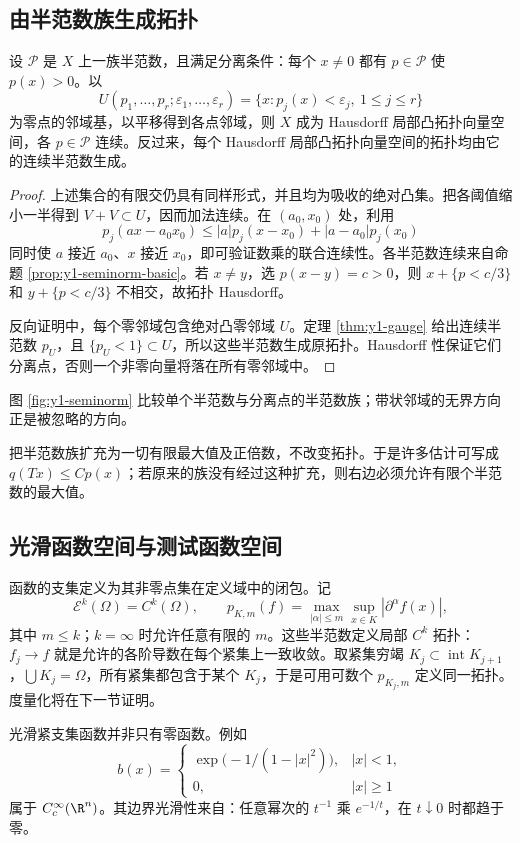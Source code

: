 \subsection{由半范数族生成拓扑}
\begin{theorem}[局部凸空间的半范数刻画]\label{thm:y1-lc}
设 $\mathcal P$ 是 $X$ 上一族半范数，且满足分离条件：每个 $x\ne0$ 都有 $p\in\mathcal P$ 使 $p(x)>0$。以
\[
 U(p_1,\ldots,p_r;\varepsilon_1,\ldots,\varepsilon_r)
 =\{x:p_j(x)<\varepsilon_j,\ 1\le j\le r\}
\]
为零点的邻域基，以平移得到各点邻域，则 $X$ 成为 Hausdorff 局部凸拓扑向量空间，各 $p\in\mathcal P$ 连续。反过来，每个 Hausdorff 局部凸拓扑向量空间的拓扑均由它的连续半范数生成。
\end{theorem}
\begin{proof}
上述集合的有限交仍具有同样形式，并且均为吸收的绝对凸集。把各阈值缩小一半得到 $V+V\subset U$，因而加法连续。在 $(a_0,x_0)$ 处，利用
\[
 p_j(ax-a_0x_0)\le |a|p_j(x-x_0)+|a-a_0|p_j(x_0)
\]
同时使 $a$ 接近 $a_0$、$x$ 接近 $x_0$，即可验证数乘的联合连续性。各半范数连续来自命题 \ref{prop:y1-seminorm-basic}。若 $x\ne y$，选 $p(x-y)=c>0$，则 $x+\{p<c/3\}$ 和 $y+\{p<c/3\}$ 不相交，故拓扑 Hausdorff。

反向证明中，每个零邻域包含绝对凸零邻域 $U$。定理 \ref{thm:y1-gauge} 给出连续半范数 $p_U$，且 $\{p_U<1\}\subset U$，所以这些半范数生成原拓扑。Hausdorff 性保证它们分离点，否则一个非零向量将落在所有零邻域中。
\end{proof}

图 \ref{fig:y1-seminorm} 比较单个半范数与分离点的半范数族；带状邻域的无界方向正是被忽略的方向。


把半范数族扩充为一切有限最大值及正倍数，不改变拓扑。于是许多估计可写成 $q(Tx)\le Cp(x)$；若原来的族没有经过这种扩充，则右边必须允许有限个半范数的最大值。

\subsection{光滑函数空间与测试函数空间}
函数的支集定义为其非零点集在定义域中的闭包。记
\[
 \mathcal E^k(\Omega)=C^k(\Omega),\qquad
 p_{K,m}(f)=\max_{|\alpha|\le m}\sup_{x\in K}|\partial^\alpha f(x)|,
\]
其中 $m\le k$；$k=\infty$ 时允许任意有限的 $m$。这些半范数定义局部 $C^k$ 拓扑：$f_j\to f$ 就是允许的各阶导数在每个紧集上一致收敛。取紧集穷竭 $K_j\subset\operatorname{int}K_{j+1}$，$\bigcup K_j=\Omega$，所有紧集都包含于某个 $K_j$，于是可用可数个 $p_{K_j,m}$ 定义同一拓扑。度量化将在下一节证明。

光滑紧支集函数并非只有零函数。例如
\[
 b(x)=\begin{cases}\exp\bigl(-1/(1-|x|^2)\bigr),&|x|<1,\\0,&|x|\ge1\end{cases}
\]
属于 $C_c^\infty(\R^n)$。其边界光滑性来自：任意幂次的 $t^{-1}$ 乘 $e^{-1/t}$，在 $t\downarrow0$ 时都趋于零。

